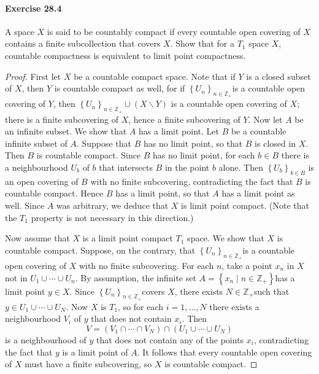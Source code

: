 \documentclass{article}
\begin{document}
\paragraph{Exercise 28.4} A space $X$ is said to be countably compact if every countable open covering of $X$ contains a finite subcollection that covers $X$. Show that for a $T_1$ space $X$, countable compactness is equivalent to limit point compactness.
\begin{proof}
    First let $X$ be a countable compact space. Note that if $Y$ is a closed subset of $X$, then $Y$ is countable compact as well, for if $\left\{U_n\right\}_{n \in \mathbb{Z}_{+}}$is a countable open covering of $Y$, then $\left\{U_n\right\}_{n \in \mathbb{Z}_{+}} \cup(X \backslash Y)$ is a countable open covering of $X$; there is a finite subcovering of $X$, hence a finite subcovering of $Y$. Now let $A$ be an infinite subset. We show that $A$ has a limit point. Let $B$ be a countable infinite subset of $A$. Suppose that $B$ has no limit point, so that $B$ is closed in $X$. Then $B$ is countable compact. Since $B$ has no limit point, for each $b \in B$ there is a neighbourhood $U_b$ of $b$ that intersects $B$ in the point $b$ alone. Then $\left\{U_b\right\}_{b \in B}$ is an open covering of $B$ with no finite subcovering, contradicting the fact that $B$ is countable compact. Hence $B$ has a limit point, so that $A$ has a limit point as well. Since $A$ was arbitrary, we deduce that $X$ is limit point compact. (Note that the $T_1$ property is not necessary in this direction.)

Now assume that $X$ is a limit point compact $T_1$ space. We show that $X$ is countable compact. Suppose, on the contrary, that $\left\{U_n\right\}_{n \in \mathbb{Z}_{+}}$is a countable open covering of $X$ with no finite subcovering. For each $n$, take a point $x_n$ in $X$ not in $U_1 \cup \cdots \cup U_n$. By assumption, the infinite set $A=\left\{x_n \mid n \in \mathbb{Z}_{+}\right\}$has a limit point $y \in X$. Since $\left\{U_n\right\}_{n \in \mathbb{Z}_{+}}$covers $X$, there exists $N \in \mathbb{Z}_{+}$such that $y \in U_1 \cup \cdots \cup U_N$. Now $X$ is $T_1$, so for each $i=1, \ldots, N$ there exists a neighbourhood $V_i$ of $y$ that does not contain $x_i$. Then
$$
V=\left(V_1 \cap \cdots \cap V_N\right) \cap\left(U_1 \cup \cdots \cup U_N\right)
$$
is a neighbourhood of $y$ that does not contain any of the points $x_i$, contradicting the fact that $y$ is a limit point of $A$. It follows that every countable open covering of $X$ must have a finite subcovering, so $X$ is countable compact.
\end{proof}
\end{document}
